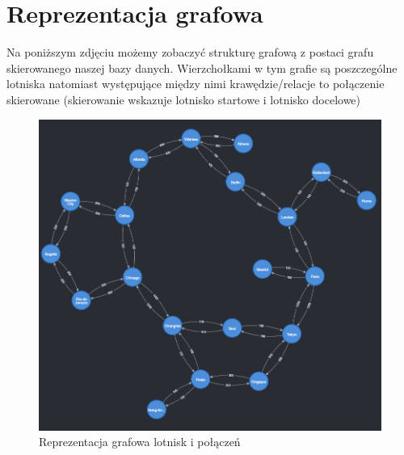 \documentclass[12pt]{article}
\begin{document}
\section{Reprezentacja grafowa}
Na poniższym zdjęciu możemy zobaczyć strukturę grafową z postaci grafu skierowanego naszej bazy danych.
Wierzchołkami w tym grafie są poszczególne lotniska natomiast występujące między nimi krawędzie/relacje to połączenie skierowane (skierowanie wskazuje lotnisko startowe i lotnisko docelowe) 
\begin{figure}[!ht]
    \includegraphics[width=0.99\linewidth]{9}  
    \caption{Reprezentacja grafowa lotnisk i połączeń}
\end{figure}
\newpage
\end{document}
